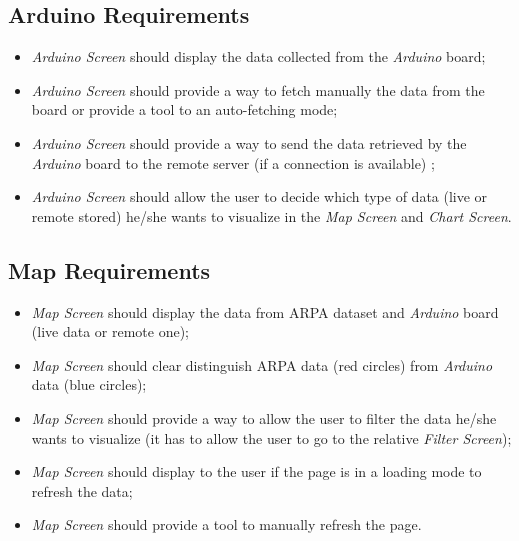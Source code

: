 \subsection{Arduino Requirements}
\begin{itemize}
    \item \textit{Arduino Screen} should display the data collected from the \textit{Arduino} board;
    \item \textit{Arduino Screen} should provide a way to fetch manually the data from the board or provide a tool to an auto-fetching mode;
    \item \textit{Arduino Screen} should provide a way to send the data retrieved by the \textit{Arduino} board to the remote server (if a connection is available) ;
    \item \textit{Arduino Screen} should allow the user to decide which type of data (live or remote stored) he/she wants to visualize in the \textit{Map Screen} and \textit{Chart Screen}.
\end{itemize}
    
\subsection{Map Requirements}
\begin{itemize}
    \item \textit{Map Screen} should display the data from ARPA dataset and \textit{Arduino} board (live data or remote one);
    \item \textit{Map Screen} should clear distinguish ARPA data (red circles) from \textit{Arduino} data (blue circles);
    \item \textit{Map Screen} should provide a way to allow the user to filter the data he/she wants to visualize (it has to allow the user to go to the relative \textit{Filter Screen});
    \item \textit{Map Screen} should display to the user if the page is in a loading mode to refresh the data;
    \item \textit{Map Screen} should provide a tool to manually refresh the page.
\end{itemize}
    
